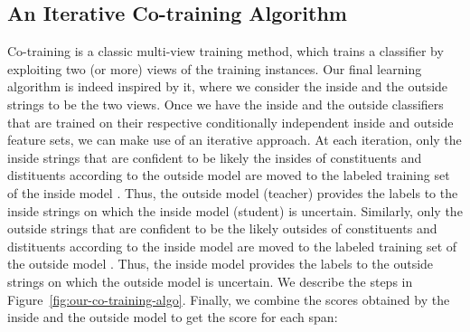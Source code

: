 \documentclass[11pt]{article}
\begin{document}
\subsection{An Iterative Co-training Algorithm}
\label{ssec:co-training-algorithm}
 Co-training \citep{10.1145/279943.279962} is a classic multi-view training method, which trains a classifier by exploiting two (or more) views of the training instances. Our final learning algorithm is indeed inspired by it, where we consider the inside and the outside strings to be the two views. Once we have the inside  and the outside classifiers  that are trained on their respective conditionally independent inside  and outside  feature sets, we can make use of an iterative approach. At each iteration, only the inside strings  that are confident to be likely the insides of constituents and distituents according to the outside model are moved to the labeled training set of the inside model . Thus, the outside model (teacher) provides the labels to the inside strings on which the inside model (student) is uncertain. Similarly, only the outside strings  that are confident to be the likely outsides of constituents and distituents according to the inside model are moved to the labeled training set of the outside model . Thus, the inside model provides the labels to the outside strings on which the outside model is uncertain. We describe the steps in Figure~\ref{fig:our-co-training-algo}.
Finally, we combine the scores obtained by the inside and the outside model to get the score  for each span:
\end{document}

